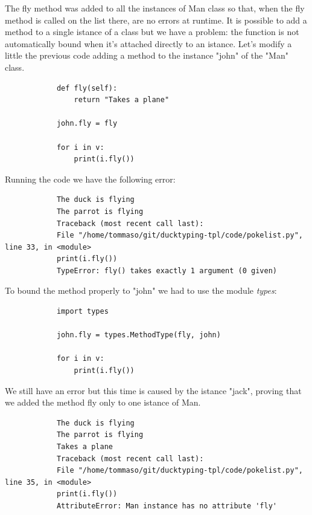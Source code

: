 \documentclass[12pt]{article}
\begin{document}
		The fly method was added to all the instances of Man class so that, when the fly method is called on the list there, are no errors at runtime. It is possible to add a method to a single istance of a class but we have a problem: the function is not automatically bound when it's attached directly to an istance. Let's modify a little the previous code adding a method to the instance "john" of the "Man" class.
		 
		\begin{lstlisting}
			def fly(self):
				return "Takes a plane"
			
			john.fly = fly
			
			for i in v:
				print(i.fly())
		\end{lstlisting}
		
		Running the code we have the following error:
		
		\begin{lstlisting}
			The duck is flying
			The parrot is flying
			Traceback (most recent call last):
			File "/home/tommaso/git/ducktyping-tpl/code/pokelist.py", line 33, in <module>
			print(i.fly())
			TypeError: fly() takes exactly 1 argument (0 given)
		\end{lstlisting}
		
		To bound the method properly to "john" we had to use the module \textit{types}:
		
		\begin{lstlisting}
			import types
			
			john.fly = types.MethodType(fly, john)
			
			for i in v:
				print(i.fly())
		\end{lstlisting}
		
		We still have an error but this time is caused by the istance "jack", proving that we added the method fly only to one istance of Man. 
		
		\begin{lstlisting}
			The duck is flying
			The parrot is flying
			Takes a plane
			Traceback (most recent call last):
			File "/home/tommaso/git/ducktyping-tpl/code/pokelist.py", line 35, in <module>
			print(i.fly())
			AttributeError: Man instance has no attribute 'fly'
		\end{lstlisting}
		
		
		
		
	
		
		






		
\end{document}

